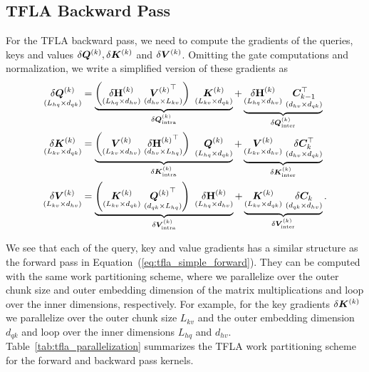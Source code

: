 \documentclass{article}
\begin{document}
    \subsection{TFLA Backward Pass}
    \label{app:tfla_backward_pass}
    For the TFLA backward pass, we need to compute the gradients of the queries, keys and values $\delta \bm{Q}^{(k)}, \delta \bm{K}^{(k)}$ and $\delta \bm{V}^{(k)}$.
    Omitting the gate computations and normalization, we write a simplified version of these gradients as
    \begin{align}
        \underset{(L_{hq} \times d_{qk})}{\delta \BQ^{(k)}} & = \underbrace{\left(\underset{(L_{hq} \times d_{hv})}{\delta \bm{\rH}^{(k)}} \ \underset{(d_{hv} \times L_{kv})}{{\BV^{(k)}}^\top} \right) \ \underset{(L_{kv} \times d_{qk})}{\BK^{(k)}}}_{\delta \BQ^{(k)}_\text{intra}} + \underbrace{\underset{(L_{hq} \times d_{hv})}{\delta \bm{\rH}^{(k)}} \ \underset{(d_{hv} \times d_{qk})}{\BC_{k-1}^\top}}_{\delta \BQ^{(k)}_\text{inter}} \\
        \underset{(L_{kv} \times d_{qk})}{\delta \BK^{(k)}} & = \underbrace{\left(\underset{(L_{kv} \times d_{hv})}{\BV^{(k)}} \ \underset{(d_{hv} \times L_{hq})}{{\delta \bm{\rH}^{(k)}}^\top} \right) \ \underset{(L_{hq} \times d_{qk})}{\BQ^{(k)}}}_{\delta \BK^{(k)}_\text{intra}} + \underbrace{\underset{(L_{kv} \times d_{hv})}{\BV^{(k)}} \ \underset{(d_{hv} \times d_{qk})}{\delta \BC_{k}^\top}}_{\delta \BK^{(k)}_\text{inter}}        \\
        \underset{(L_{kv} \times d_{hv})}{\delta \BV^{(k)}} & = \underbrace{\left(\underset{(L_{kv} \times d_{qk})}{\BK^{(k)}} \ \underset{(d_{qk} \times L_{hq})}{{\BQ^{(k)}}^\top} \right) \ \underset{(L_{hq} \times d_{hv})}{\delta \bm{\rH}^{(k)}}}_{\delta \BV^{(k)}_\text{intra}} + \underbrace{\underset{(L_{kv} \times d_{qk})}{\BK^{(k)}} \ \underset{(d_{qk} \times d_{hv})}{\delta \BC_{k}}}_{\delta \BV^{(k)}_\text{inter}}.
    \end{align}

    We see that each of the query, key and value gradients has a similar structure as the forward pass in Equation~(\ref{eq:tfla_simple_forward}).
    They can be computed with the same work partitioning scheme, where we parallelize over the outer chunk size and outer embedding dimension of the matrix multiplications and loop over the inner dimensions, respectively.
    For example, for the key gradients $\delta \bm{K}^{(k)}$ we parallelize over the outer chunk size $L_{kv}$ and the outer embedding dimension $d_{qk}$ and loop over the inner dimensions $L_{hq}$ and $d_{hv}$.
    Table~\ref{tab:tfla_parallelization} summarizes the TFLA work partitioning scheme for the forward and backward pass kernels.
\end{document}
